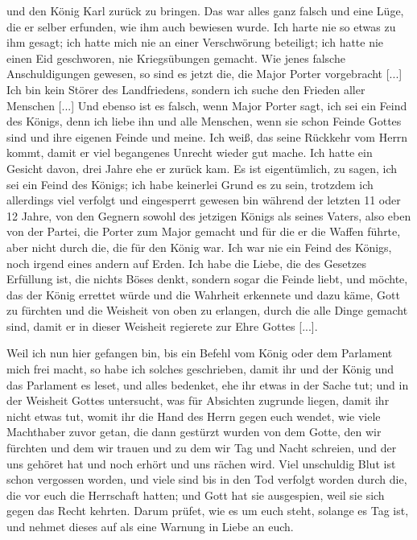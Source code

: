 und den König Karl zurück zu bringen. Das war alles ganz
falsch und eine Lüge, die er selber erfunden, wie ihm auch bewiesen 
wurde. Ich harte nie so etwas zu ihm gesagt; ich hatte
mich nie an einer Verschwörung beteiligt; ich hatte nie einen Eid
geschworen, nie Kriegsübungen gemacht. Wie jenes falsche 
Anschuldigungen gewesen, so sind es jetzt die, die Major Porter 
vorgebracht [...] Ich bin kein Störer des Landfriedens, sondern
ich suche den Frieden aller Menschen [...] Und ebenso ist es
falsch, wenn Major Porter sagt, ich sei ein Feind des Königs,
denn ich liebe ihn und alle Menschen, wenn sie schon Feinde
Gottes sind und ihre eigenen Feinde und meine. Ich weiß, das
seine Rückkehr vom Herrn kommt, damit er viel begangenes Unrecht 
wieder gut mache. Ich hatte ein Gesicht davon, drei Jahre
ehe er zurück kam. Es ist eigentümlich, zu sagen, ich sei ein
Feind des Königs; ich habe keinerlei Grund es zu sein, trotzdem
ich allerdings viel verfolgt und eingesperrt gewesen bin während
der letzten 11 oder 12 Jahre, von den Gegnern sowohl des
jetzigen Königs als seines Vaters, also eben von der Partei, die
Porter zum Major gemacht und für die er die Waffen führte,
aber nicht durch die, die für den König war. Ich war nie ein
Feind des Königs, noch irgend eines andern auf Erden. Ich
habe die Liebe, die des Gesetzes Erfüllung ist, die nichts Böses
denkt, sondern sogar die Feinde liebt, und möchte, das der König
errettet würde und die Wahrheit erkennete und dazu käme, Gott
zu fürchten und die Weisheit von oben zu erlangen, durch die
alle Dinge gemacht sind, damit er in dieser Weisheit regierete zur
Ehre Gottes [...].

Weil ich nun hier gefangen bin, bis ein Befehl vom König
oder dem Parlament mich frei macht, so habe ich solches geschrieben, 
damit ihr und der König und das Parlament es
leset, und alles bedenket, ehe ihr etwas in der Sache tut; und
in der Weisheit Gottes untersucht, was für Absichten zugrunde 
liegen, damit ihr nicht etwas tut, womit ihr die Hand
des Herrn gegen euch wendet, wie viele Machthaber zuvor getan,
die dann gestürzt wurden von dem Gotte, den wir fürchten und
dem wir trauen und zu dem wir Tag und Nacht schreien, und
der uns gehöret hat und noch erhört und uns rächen wird. Viel
unschuldig Blut ist schon vergossen worden, und viele sind bis in
den Tod verfolgt worden durch die, die vor euch die Herrschaft
hatten; und Gott hat sie ausgespien, weil sie sich gegen das
Recht kehrten. Darum prüfet, wie es um euch steht, solange es
Tag ist, und nehmet dieses auf als eine Warnung in Liebe
an euch.\grqq

